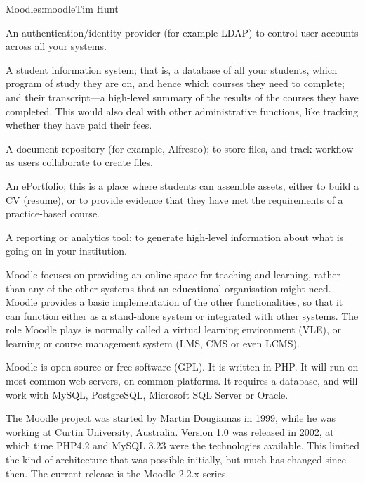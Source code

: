 \begin{aosachapter}{Moodle}{s:moodle}{Tim Hunt}
\begin{aosaitemize}

\item An authentication/identity provider (for example LDAP) to
  control user accounts across all your systems.

\item A student information system; that is, a database of all your
  students, which program of study they are on, and hence which
  courses they need to complete; and their transcript---a high-level 
  summary of the results of the courses they have
  completed. This would also deal with other administrative functions,
  like tracking whether they have paid their fees.

\item A document repository (for example, Alfresco); to store files,
  and track workflow as users collaborate to create files.

\item An ePortfolio; this is a place where students can assemble assets,
  either to build a CV (resume), or to
  provide evidence that they have met the requirements of a
  practice-based course.

\item A reporting or analytics tool; to generate high-level
  information about what is going on in your institution.

\end{aosaitemize}

Moodle focuses on providing an online space for
teaching and learning, rather than any of the other systems that an
educational organisation might need. Moodle provides a basic
implementation of the other functionalities, so that it can function either as
a stand-alone system or integrated with other systems. The role
Moodle plays is normally called a virtual learning environment (VLE),
or learning or course management system (LMS, CMS or even LCMS).

Moodle is open source or free software (GPL). It is written in PHP. It
will run on most common web servers, on common platforms. It requires
a database, and will work with MySQL, PostgreSQL, Microsoft SQL Server or
Oracle.

The Moodle project was started by Martin Dougiamas in 1999, while he
was working at Curtin University, Australia. Version 1.0 was released
in 2002, at which time PHP4.2 and MySQL 3.23 were the technologies
available. This limited the kind of architecture that was possible
initially, but much has changed since then. The current release is the
Moodle 2.2.x series.


\end{aosachapter}
